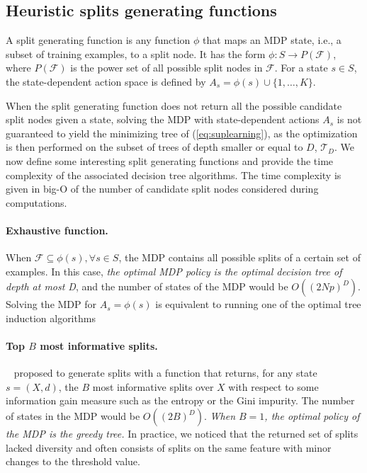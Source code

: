\subsection{Heuristic splits generating functions}\label{sec:testgen}

A split generating function is any function $\phi$ that maps an MDP state, i.e., a subset of training examples, to a split node. It has the form $\phi: S \rightarrow P(\mathcal{F})$, where $P(\mathcal{F})$ is the power set of all possible split nodes in $\mathcal F$. 
For a state $s \in S$, the state-dependent action space is defined by $A_s = \phi(s) \cup  \{1,\ldots,K\}$. 

When the split generating function does not return all the possible candidate split nodes given a state, solving the MDP with state-dependent actions $A_s$ is not guaranteed to yield the minimizing tree of (\ref{eq:suplearning}), as the 
optimization is then performed on the subset of trees of depth smaller or equal to $D$, $\mathcal{T}_D$. 
We now define some interesting split generating functions and provide the time complexity of the associated decision tree algorithms. The time complexity is given in big-O of the number of candidate split nodes considered during computations. 

\paragraph{Exhaustive function.} When $\mathcal{F} \subseteq \phi(s), \forall s \in S$, the MDP contains all possible splits of a certain set of examples. In this case, \textit{the optimal MDP policy is the optimal decision tree of depth at most D},
and the number of states of the MDP would be $O({(2Np)}^D)$. Solving the MDP for $A_s = \phi(s)$ is equivalent to running one of the optimal tree induction algorithms~\cite{verwer2017learning,oct,pystreed,quantbnb,binoct,murtree,mfoct,blossom,lin2020generalized,chaouki2024branchesfastdynamicprogramming}

\paragraph{Top $B$ most informative splits.}\label{topk-heuristic}~\cite{topk} proposed to generate splits with a function that returns, for any state $s=(X,d)$, the $B$ most informative splits over $X$ with respect to some information gain measure such as the entropy or the Gini impurity. 
The number of states in the MDP would be $O({(2B)}^D)$. \textit{When $B=1$, the optimal policy of the MDP is the greedy tree.} 
In practice, we noticed that the returned set of splits lacked diversity and often consists of splits on the same feature with minor changes to the threshold value. 

